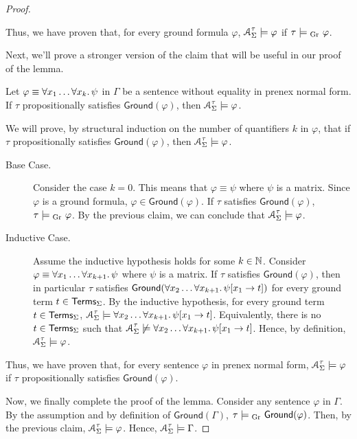 \documentclass[11pt,usenames, dvipsnames]{article}
\begin{document}
\begin{proof}
\begin{subproof}[Subproof.]
    Thus, we have proven that, for every ground formula $\varphi$, $\struct_\Sigma^\tau \models \varphi$ if $\tau \models\textsubscript{Gr}\  \varphi$.
  \end{subproof}

  Next, we'll prove a stronger version of the claim that will be useful in our proof of the lemma.

  \begin{claim}
    Let $\varphi \equiv \forall x_1 \ldots \forall x_k \ldotp \psi$ in $\Gamma$ be a sentence without equality in prenex normal form. If $\tau$ propositionally satisfies $\mathsf{Ground}(\varphi)$, then $\struct_\Sigma^\tau \models \varphi$.
  \end{claim}

  \begin{subproof}[Subproof.]
    We will prove, by structural induction on the number of quantifiers $k$ in $\varphi$, that if $\tau$ propositionally satisfies $\mathsf{Ground}(\varphi)$, then $\struct_\Sigma^\tau \models \varphi$.

    \begin{description}
      \item[Base Case.] Consider the case $k = 0$. This means that $\varphi \equiv \psi$ where $\psi$ is a matrix. Since $\varphi$ is a ground formula, $\varphi \in \mathsf{Ground}(\varphi)$. If $\tau$ satisfies $\mathsf{Ground}(\varphi)$, $\tau \models\textsubscript{Gr}\  \varphi$. By the previous claim, we can conclude that $\struct_\Sigma^\tau \models \varphi$.
      
      \item[Inductive Case.] Assume the inductive hypothesis holds for some $k \in \mathbb{N}$. Consider $\varphi \equiv \forall x_1 \ldots \forall x_{k+1} \ldotp \psi$ where $\psi$ is a matrix. If $\tau$ satisfies $\mathsf{Ground}(\varphi)$, then in particular $\tau$ satisfies $\mathsf{Ground}(\forall x_2 \ldots \forall x_{k+1} \ldotp \psi [x_1 \to t])$ for every ground term $t \in \mathsf{Terms}_\Sigma$. By the inductive hypothesis, for every ground term $t \in \mathsf{Terms}_\Sigma$, $\struct_\Sigma^\tau \models \forall x_2 \ldots \forall x_{k+1} \ldotp \psi [x_1 \to t]$. Equivalently, there is no $t \in \mathsf{Terms}_\Sigma$ such that $\struct_\Sigma^\tau \not\models \forall x_2 \ldots \forall x_{k+1} \ldotp \psi [x_1 \to t]$. Hence, by definition, $\struct_\Sigma^\tau \models \varphi$.
    \end{description}

    Thus, we have proven that, for every sentence $\varphi$ in prenex normal form, $\struct_\Sigma^\tau \models \varphi$ if $\tau$ propositionally satisfies $\mathsf{Ground}(\varphi)$.
  \end{subproof}

  Now, we finally complete the proof of the lemma. Consider any sentence $\varphi$ in $\Gamma$. By the assumption and by definition of $\mathsf{Ground}(\Gamma)$, $\tau \models\textsubscript{Gr}\  \mathsf{Ground}(\varphi)$. Then, by the previous claim, $\struct_\Sigma^\tau \models \varphi$. Hence, $\struct_\Sigma^\tau \models \Gamma$.
\end{proof}
\end{document}
